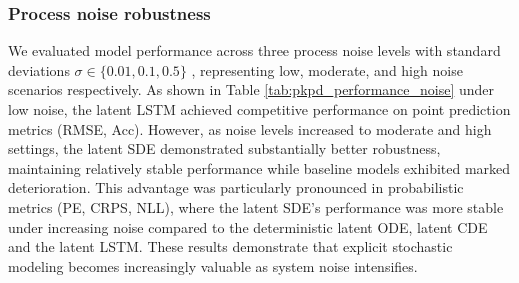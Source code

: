 \documentclass[preprint,12pt]{elsarticle}
\begin{document}
\subsubsection{Process noise robustness}
We evaluated model performance across three process noise levels with standard deviations $\sigma \in \{0.01, 0.1, 0.5\}$ , representing low, moderate, and high noise scenarios respectively. As shown in Table \ref{tab:pkpd_performance_noise} under low noise, the latent LSTM achieved competitive performance on point prediction metrics (RMSE, Acc). However, as noise levels increased to moderate and high settings, the latent SDE demonstrated substantially better robustness, maintaining relatively stable performance while baseline models exhibited marked deterioration. This advantage was particularly pronounced in probabilistic metrics (PE, CRPS, NLL), where the latent SDE's performance was more stable under increasing noise compared to the deterministic latent ODE, latent CDE and the latent LSTM. These results demonstrate that explicit stochastic modeling becomes increasingly valuable as system noise intensifies.
\end{document}
